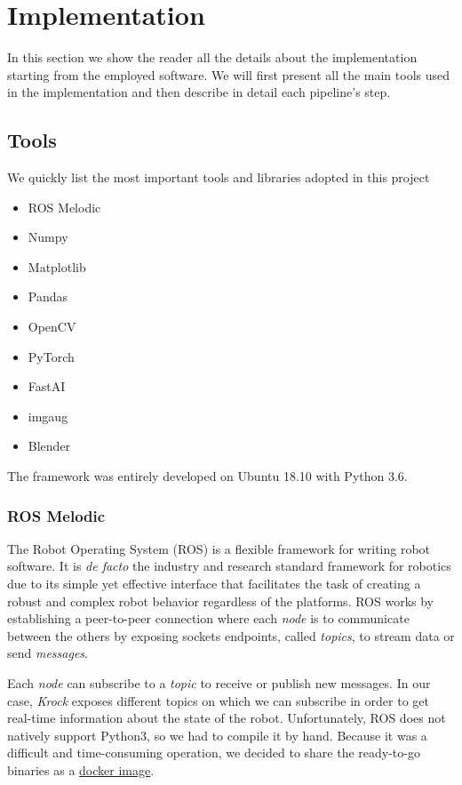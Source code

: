 \documentclass[../document.tex]{subfiles}
\begin{document}
\section{Implementation}
In this section we show the reader all the details about the implementation starting from the employed software. We will first present all the main tools used in the implementation and then describe in detail each pipeline's step.
\subsection{Tools}
We quickly list the most important tools and libraries adopted in this project
\begin{itemize}
    \item ROS Melodic
    \item Numpy
    \item Matplotlib
    \item Pandas
    \item OpenCV
    \item PyTorch
    \item FastAI
    \item imgaug
    \item Blender
\end{itemize}
The framework was entirely developed on Ubuntu 18.10 with Python 3.6.

\subsubsection{ROS Melodic}
The Robot Operating System (ROS) \cite{ROS} is a flexible framework for writing robot software. It is \emph{de facto} the industry and research standard framework for robotics due to its simple yet effective interface that facilitates the task of creating a robust and complex robot behavior regardless of the platforms. ROS works by establishing a peer-to-peer connection where each \emph{node} is to communicate between the others by exposing sockets endpoints, called \emph{topics}, to stream data or send \emph{messages}. 

Each \emph{node} can subscribe to a \emph{topic} to receive or publish new messages. In our case, \emph{Krock} exposes different topics on which we can subscribe in order to get real-time information about the state of the robot.
Unfortunately, ROS does not natively support Python3, so we had to compile it by hand. Because it was a difficult and time-consuming operation, we decided to share the ready-to-go binaries as a \href{https://hub.docker.com/r/zuppif/ros-melodic-python3/}{docker image}. 
\end{document}
